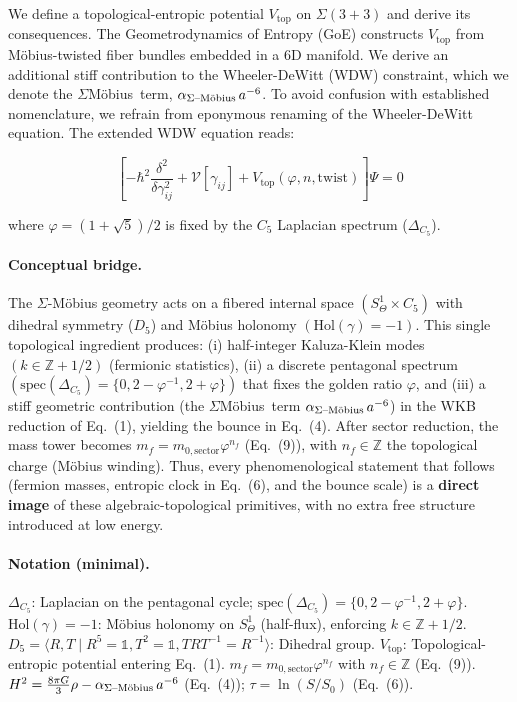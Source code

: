 \documentclass[12pt]{article}
\theoremstyle{definition}
\theoremstyle{plain}
\newcommand{\Moebius}{M\"obius}
\newcommand{\SigMoeb}{\ensuremath{\Sigma}\text{--}\Moebius}
\newcommand{\StiffTerm}{\ensuremath{\alpha_{\text{\SigMoeb}}\, a^{-6}}}
\begin{document}
We define a topological-entropic potential $V_{\text{top}}$ on $\Sigma(3+3)$ and derive its consequences. The Geometrodynamics of Entropy (GoE) constructs $V_{\text{top}}$ from \Moebius-twisted fiber bundles embedded in a 6D manifold. We derive an additional stiff contribution to the Wheeler-DeWitt (WDW) constraint, which we denote the \SigMoeb\ term, $\StiffTerm$. To avoid confusion with established nomenclature, we refrain from eponymous renaming of the Wheeler-DeWitt equation. The extended WDW equation reads:

\begin{equation}
\left[-\hbar^2 \frac{\delta^2}{\delta\gamma_{ij}^2} + \mathcal{V}[\gamma_{ij}] + V_{\text{top}}(\varphi, n, \text{twist})\right] \Psi = 0
\end{equation}

where $\varphi = (1+\sqrt{5})/2$ is fixed by the $C_5$ Laplacian spectrum ($\Delta_{C_5}$).

\paragraph{Conceptual bridge.} The $\Sigma$-M\"obius geometry acts on a fibered internal space $(S^1_\Theta \times C_5)$ with dihedral symmetry ($D_5$) and M\"obius holonomy $(\text{Hol}(\gamma) = -1)$. This single topological ingredient produces: (i) half-integer Kaluza-Klein modes $(k \in \mathbb{Z} + 1/2)$ (fermionic statistics), (ii) a discrete pentagonal spectrum $(\text{spec}(\Delta_{C_5}) = \{0, 2-\varphi^{-1}, 2+\varphi\})$ that fixes the golden ratio $\varphi$, and (iii) a stiff geometric contribution (the \SigMoeb\ term $\StiffTerm$) in the WKB reduction of Eq.~(1), yielding the bounce in Eq.~(4). After sector reduction, the mass tower becomes $m_f = m_{0,\text{sector}} \varphi^{n_f}$ (Eq.~(9)), with $n_f \in \mathbb{Z}$ the topological charge (M\"obius winding). Thus, every phenomenological statement that follows (fermion masses, entropic clock in Eq.~(6), and the bounce scale) is a \textbf{direct image} of these algebraic-topological primitives, with no extra free structure introduced at low energy.

\paragraph{Notation (minimal).}
$\Delta_{C_5}$: Laplacian on the pentagonal cycle; $\text{spec}(\Delta_{C_5}) = \{0, 2-\varphi^{-1}, 2+\varphi\}$.
$\text{Hol}(\gamma) = -1$: M\"obius holonomy on $S^1_\Theta$ (half-flux), enforcing $k \in \mathbb{Z} + 1/2$.
$D_5 = \langle R, T \mid R^5 = \mathbb{1}, T^2 = \mathbb{1}, TRT^{-1} = R^{-1} \rangle$: Dihedral group.
$V_{\text{top}}$: Topological-entropic potential entering Eq.~(1).
$m_f = m_{0,\text{sector}} \varphi^{n_f}$ with $n_f \in \mathbb{Z}$ (Eq.~(9)).
$H^2 = \tfrac{8\pi G}{3}\rho - \StiffTerm$ (Eq.~(4)); $\tau = \ln(S/S_0)$ (Eq.~(6)).
\end{document}

